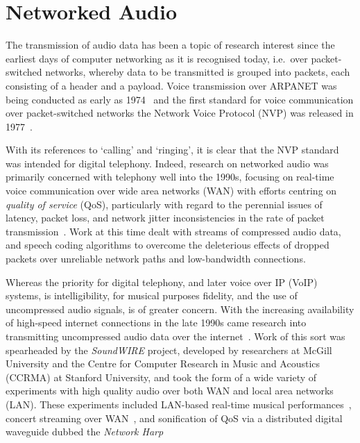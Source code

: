 \section{Networked Audio}\label{sec:networked-audio}

The transmission of audio data has been a topic of research interest since the
earliest days of computer networking as it is recognised today, i.e.\ over
packet-switched networks, whereby data to be transmitted is grouped into
packets, each consisting of a header and a payload.
Voice transmission over ARPANET was being conducted as early as
1974~\citep{schulzrinne_voice_1992} and the first standard for voice
communication over packet-switched networks \textemdash{} the Network Voice
Protocol (NVP) \textemdash{} was released in
1977~\citep{cohen_specifications_1977}.

With its references to `calling' and `ringing', it is clear that the NVP
standard was intended for digital telephony.
Indeed, research on networked audio was primarily concerned with telephony well
into the 1990s, focusing on real-time voice communication over wide area
networks (WAN) with efforts centring on \textit{quality of service} (QoS),
particularly with regard to the perennial issues of latency, packet loss, and
network jitter \textemdash{} inconsistencies in the rate of packet
transmission~\citep{hardman_reliable_1995,hardman_successful_1998}.
Work at this time dealt with streams of compressed audio data, and speech
coding algorithms to overcome the deleterious effects of dropped packets over
unreliable network paths and low-bandwidth connections.

Whereas the priority for digital telephony, and later voice over IP (VoIP)
systems, is intelligibility, for musical purposes fidelity, and the use of
uncompressed audio signals, is of greater concern.
With the increasing availability of high-speed internet connections in the late
1990s came research into transmitting uncompressed audio data over the
internet~\citep{chafe_simplified_2000,xu_real-time_2000}.
Work of this sort was spearheaded by the \textit{SoundWIRE} project, developed
by researchers at McGill University and the Centre for Computer Research in
Music and Acoustics (CCRMA) at Stanford University, and took the form of
a wide variety of experiments with high quality audio over both WAN and local
area networks (LAN).
These experiments included LAN-based real-time musical
performances~\citep{chafe_simplified_2000}, concert streaming over
WAN~\citep{xu_real-time_2000,chafe_simplified_2000}, and sonification of QoS via
a distributed digital waveguide dubbed the
\textit{Network Harp}~\citep{chafe_simplified_2000,chafe_physical_2002}

